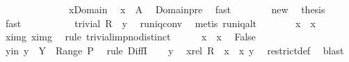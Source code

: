 \begin{isabellebody}
\ \ \ \ \isamarkupfalse%
\ {\isacharminus}\isanewline
\ \ \ \ \ \ \isamarkupfalse%
\ x{\isacharprime}{\isacharunderscore}Domain\ \isamarkupfalse%
\ {\isachardoublequoteopen}x{\isacharprime}\ {\isasymin}\ A{\isachardoublequoteclose}\ \isamarkupfalse%
\ Domain{\isacharunderscore}pre\ \isamarkupfalse%
\ fast\isanewline
\ \ \ \ \ \ \isamarkupfalse%
\ new\ \isamarkupfalse%
\ {\isacharquery}thesis\ \isamarkupfalse%
\ fast\isanewline
\ \ \ \ \isamarkupfalse%
\isanewline
\ \ \ \ \isamarkupfalse%
\ {\isachardoublequoteopen}trivial\ {\isacharparenleft}R{\isasyminverse}\ {\isacharbackquote}{\isacharbackquote}\ {\isacharbraceleft}y{\isacharbraceright}{\isacharparenright}{\isachardoublequoteclose}\ \isamarkupfalse%
\ runiq{\isacharunderscore}conv\ \isamarkupfalse%
\ {\isacharparenleft}metis\ runiq{\isacharunderscore}alt{\isacharparenright}\isanewline
\ \ \ \ \isamarkupfalse%
\ \isamarkupfalse%
\ {\isachardoublequoteopen}x{\isacharprime}\ {\isacharequal}\ x{\isachardoublequoteclose}\ \isamarkupfalse%
\ x{\isacharprime}{\isacharunderscore}img\ x{\isacharunderscore}img\ \isamarkupfalse%
\ {\isacharparenleft}rule\ trivial{\isacharunderscore}imp{\isacharunderscore}no{\isacharunderscore}distinct{\isacharparenright}\isanewline
\ \ \ \ \isamarkupfalse%
\ {\isacharbackquoteopen}x{\isacharprime}\ {\isasymnoteq}\ x{\isacharbackquoteclose}\ \isamarkupfalse%
\ False\ \isacommand{{\isachardot}{\isachardot}}\isamarkupfalse%
\isanewline
\ \ \isamarkupfalse%
\isanewline
\ \ \isamarkupfalse%
\ \isamarkupfalse%
\ y{\isacharunderscore}in{\isacharcolon}\ {\isachardoublequoteopen}y\ {\isasymin}\ Y\ {\isacharminus}\ Range\ {\isacharquery}P{\isachardoublequoteclose}\ \isamarkupfalse%
\ {\isacharparenleft}rule\ DiffI{\isacharparenright}\isanewline
\isanewline
\ \ \isamarkupfalse%
\ y\ \isamarkupfalse%
\ x{\isacharunderscore}rel{\isacharcolon}\ {\isachardoublequoteopen}R\ {\isacharbar}{\isacharbar}\ {\isacharbraceleft}x{\isacharbraceright}\ {\isacharequal}\ {\isacharbraceleft}{\isacharparenleft}x{\isacharcomma}\ y{\isacharparenright}{\isacharbraceright}{\isachardoublequoteclose}\ \isamarkupfalse%
\ restrict{\isacharunderscore}def\ \isamarkupfalse%
\ blast\isanewline

\end{isabellebody}
